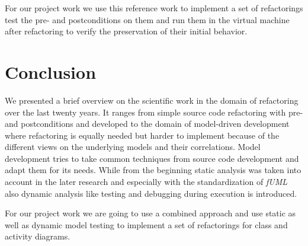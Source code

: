 \documentclass{llncs}
\begin{document}
For our project work we use this reference work to implement a set of refactorings test the pre- and postconditions on
them and run them in the virtual machine after refactoring to verify the preservation of their initial behavior.

\section{Conclusion}
\label{sec:conclusion}

We presented a brief overview on the scientific work in the domain of refactoring over the last twenty years. It ranges
from simple source code refactoring with pre- and postconditions and developed to the domain of model-driven development
where refactoring is equally needed but harder to implement because of the different views on the underlying models and
their correlations. Model development tries to take common techniques from source code development and adapt them for
its needs. While from the beginning static analysis was taken into account in the later research and especially with the
standardization of \textit{fUML} also dynamic analysis like testing and debugging during execution is introduced.

For our project work we are going to use a combined approach and use static as well as dynamic model testing to
implement a set of refactorings for class and activity diagrams.

\newpage


\end{document}
